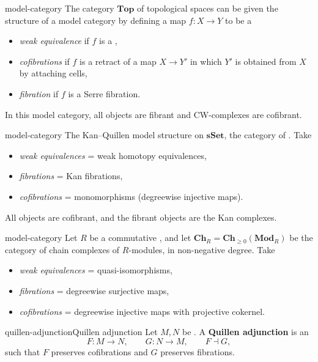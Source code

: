 \begin{example}{model-category}
    The category $\textbf{Top}$ of topological spaces can be given the structure of a model category by defining a map $f : X \to Y$ to be a
    \begin{itemize}
        \item \textit{weak equivalence} if $f$ is a ,
        \item \textit{cofibrations} if $f$ is a retract of a map $X \to Y'$ in which $Y'$ is obtained from $X$ by attaching cells,
        \item \textit{fibration} if $f$ is a Serre fibration.
    \end{itemize}
    In this model category, all objects are fibrant and CW-complexes are cofibrant.
\end{example}

\begin{example}{model-category}
    The Kan--Quillen model structure on $\textbf{sSet}$, the category of . Take
    \begin{itemize}
        \item \textit{weak equivalences} = weak homotopy equivalences,
        \item \textit{fibrations} = Kan fibrations,
        \item \textit{cofibrations} = monomorphisms (degreewise injective maps).
    \end{itemize}
    All objects are cofibrant, and the fibrant objects are the Kan complexes.
\end{example}

\begin{example}{model-category}
    Let $R$ be a commutative , and let $\textbf{Ch}_R = \textbf{Ch}_{\ge 0}(\textbf{Mod}_R)$ be the category of chain complexes of $R$-modules, in non-negative degree. Take
    \begin{itemize}
        \item \textit{weak equivalences} = quasi-isomorphisms,
        \item \textit{fibrations} = degreewise surjective maps,
        \item \textit{cofibrations} = degreewise injective maps with projective cokernel.
    \end{itemize}
\end{example}

\begin{topic}{quillen-adjunction}{Quillen adjunction}
    Let $M, N$ be . A \textbf{Quillen adjunction} is an 
    \[ F : M \to N, \qquad G : N \to M, \qquad F \dashv G , \]
    such that $F$ preserves cofibrations and $G$ preserves fibrations.
\end{topic}

